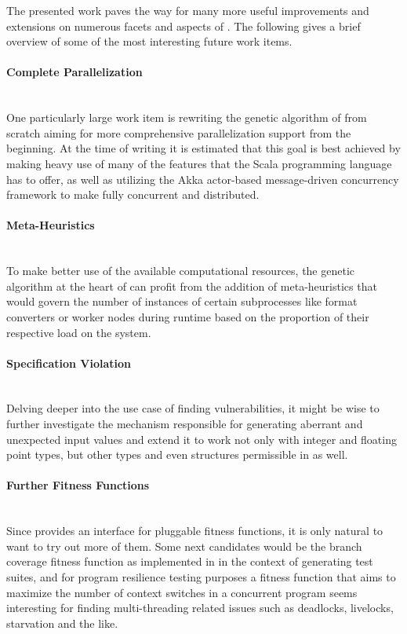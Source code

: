 The presented work paves the way for many more useful improvements and extensions on numerous facets and
aspects of \xmlmate. The following gives a brief overview of some of the most interesting future work items.

\paragraph{Complete Parallelization} ~\\
One particularly large work item is rewriting the
genetic algorithm of \xmlmate from scratch aiming for more comprehensive parallelization support from the
beginning.
At the time of writing it is estimated that this goal is best achieved by making heavy use of many of the features that the
Scala\cite{scala-overview-tech-report} programming language has to offer, as well as utilizing the Akka actor-based message-driven concurrency framework\cite{Wyatt:2013:AC:2663429} to make \xmlmate fully
concurrent and distributed.
\paragraph{Meta-Heuristics} ~\\
To make better use of the available computational resources, the genetic algorithm at the heart of
\xmlmate can profit from the addition of meta-heuristics that would govern the number of instances of certain
subprocesses like format converters or worker nodes during runtime based on the proportion of their
respective load on the system.
\paragraph{Specification Violation} ~\\
Delving deeper into the use case of finding vulnerabilities, it might be wise to further investigate
the mechanism responsible for generating aberrant and unexpected input values and extend it to work not only
with integer and floating point types, but other types and even structures permissible in \xml as well.
\paragraph{Further Fitness Functions} ~\\
Since \xmlmate provides an interface for pluggable fitness functions, it is only natural to want to try
out more of them. Some next candidates would be the branch coverage fitness function as implemented in
\evosuite in the context of generating test suites, and for program resilience testing purposes a fitness
function that aims to maximize the number of context switches in a concurrent program seems interesting for
finding multi-threading related issues such as deadlocks, livelocks, starvation and the like.
